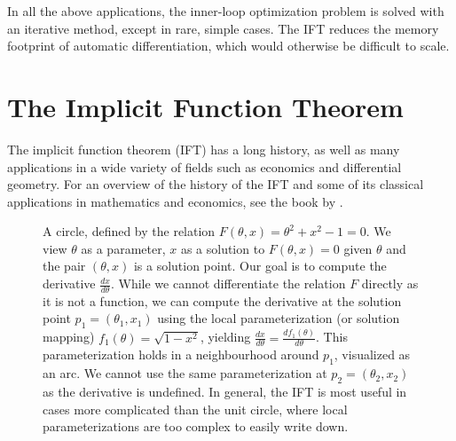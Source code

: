 \documentclass[11pt]{article}
\begin{document}
In all the above applications, the inner-loop optimization problem is solved
with an iterative method, except in rare, simple cases.
The IFT reduces the memory footprint of automatic differentiation,
which would otherwise be difficult to scale.

\section{The Implicit Function Theorem}
The implicit function theorem (IFT) has a long history, as well as many applications
in a wide variety of fields such as economics and differential geometry.
For an overview of the history of the IFT and some of its classical applications
in mathematics and economics,
see the book by \citet{iftbook}.

\begin{figure}
\centering
{}
\caption{
\label{fig:circle}
A circle, defined by the relation $F(\theta,x) = \theta^2 + x^2 - 1 = 0$.
We view $\theta$ as a parameter, $x$ as a solution to $F(\theta,x)=0$ given $\theta$
and the pair $(\theta,x)$ is a solution point.
Our goal is to compute the derivative $\frac{dx}{d\theta}$.
While we cannot differentiate the relation $F$ directly as it is not a function,
we can compute the derivative at the solution point $p_1 = (\theta_1,x_1)$
using the local parameterization (or solution mapping) $f_1(\theta)=\sqrt{1-x^2}$,
yielding $\frac{dx}{d\theta}= \frac{df_1(\theta)}{d\theta}$.
This parameterization holds
in a neighbourhood around $p_1$, visualized as an arc.
We cannot use the same parameterization at $p_2 = (\theta_2, x_2)$ as the derivative is undefined.
In general, the IFT is most useful in cases more complicated than the unit circle,
where local parameterizations are too complex to easily write down.
}
\end{figure}
\end{document}
